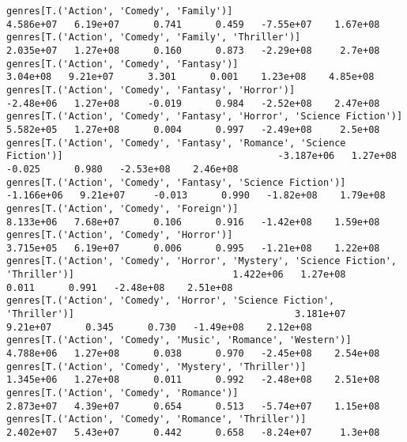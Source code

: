 \documentclass[11pt]{article}
\begin{document}
\begin{Verbatim}[commandchars=\\\{\}]
genres[T.('Action', 'Comedy', 'Family')]                                                                      4.586e+07   6.19e+07      0.741      0.459   -7.55e+07    1.67e+08
genres[T.('Action', 'Comedy', 'Family', 'Thriller')]                                                          2.035e+07   1.27e+08      0.160      0.873   -2.29e+08     2.7e+08
genres[T.('Action', 'Comedy', 'Fantasy')]                                                                      3.04e+08   9.21e+07      3.301      0.001    1.23e+08    4.85e+08
genres[T.('Action', 'Comedy', 'Fantasy', 'Horror')]                                                           -2.48e+06   1.27e+08     -0.019      0.984   -2.52e+08    2.47e+08
genres[T.('Action', 'Comedy', 'Fantasy', 'Horror', 'Science Fiction')]                                        5.582e+05   1.27e+08      0.004      0.997   -2.49e+08     2.5e+08
genres[T.('Action', 'Comedy', 'Fantasy', 'Romance', 'Science Fiction')]                                      -3.187e+06   1.27e+08     -0.025      0.980   -2.53e+08    2.46e+08
genres[T.('Action', 'Comedy', 'Fantasy', 'Science Fiction')]                                                 -1.166e+06   9.21e+07     -0.013      0.990   -1.82e+08    1.79e+08
genres[T.('Action', 'Comedy', 'Foreign')]                                                                     8.133e+06   7.68e+07      0.106      0.916   -1.42e+08    1.59e+08
genres[T.('Action', 'Comedy', 'Horror')]                                                                      3.715e+05   6.19e+07      0.006      0.995   -1.21e+08    1.22e+08
genres[T.('Action', 'Comedy', 'Horror', 'Mystery', 'Science Fiction', 'Thriller')]                            1.422e+06   1.27e+08      0.011      0.991   -2.48e+08    2.51e+08
genres[T.('Action', 'Comedy', 'Horror', 'Science Fiction', 'Thriller')]                                       3.181e+07   9.21e+07      0.345      0.730   -1.49e+08    2.12e+08
genres[T.('Action', 'Comedy', 'Music', 'Romance', 'Western')]                                                 4.788e+06   1.27e+08      0.038      0.970   -2.45e+08    2.54e+08
genres[T.('Action', 'Comedy', 'Mystery', 'Thriller')]                                                         1.345e+06   1.27e+08      0.011      0.992   -2.48e+08    2.51e+08
genres[T.('Action', 'Comedy', 'Romance')]                                                                     2.873e+07   4.39e+07      0.654      0.513   -5.74e+07    1.15e+08
genres[T.('Action', 'Comedy', 'Romance', 'Thriller')]                                                         2.402e+07   5.43e+07      0.442      0.658   -8.24e+07     1.3e+08

\end{Verbatim}
\end{document}
